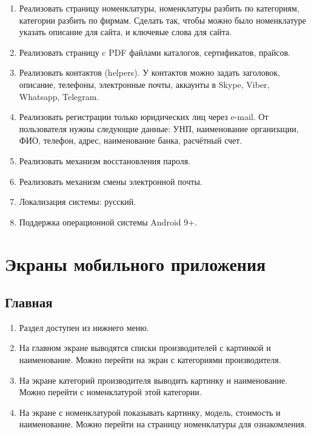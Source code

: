 \begin{enumerate}[label=\thesubsection.\arabic*, leftmargin=3cm]
    \item Реализовать страницу номенклатуры, номенклатуры разбить по категориям, категории разбить по фирмам.
    Сделать так, чтобы можно было номенклатуре указать описание для сайта, и ключевые слова для сайта.

    \item Реализовать страницу c PDF файлами каталогов, сертификатов, прайсов.

    \item Реализовать контактов (helpers). У контактов можно задать заголовок, описание, телефоны, электронные почты, аккаунты в Skype, Viber, Whatsapp, Telegram.
    
    \item Реализовать регистрации только юридических лиц через e-mail.
    От пользователя нужны следующие данные: УНП, наименование организации, ФИО, телефон, адрес, наименование банка, расчётный счет.
     
    \item Реализовать механизм восстановления пароля.
    
    \item Реализовать механизм смены электронной почты.

    \item Локализация системы: русский.

    \item Поддержка операционной системы Android 9+.
\end{enumerate}

\section{Экраны мобильного приложения}

\subsection{Главная}

\begin{enumerate}[label=\thesubsection.\arabic*, leftmargin=3cm]
    \item Раздел доступен из нижнего меню.
    \item На главном экране выводятся списки производителей с картинкой и наименование. Можно перейти на экран с категориями производителя.
    \item На экране категорий производителя выводить картинку и наименование. Можно перейти с номенклатурой этой категории.
    \item На экране с номенклатурой показывать картинку, модель, стоимость и наименование. Можно перейти на страницу номенклатуры для ознакомления. 
\end{enumerate}

